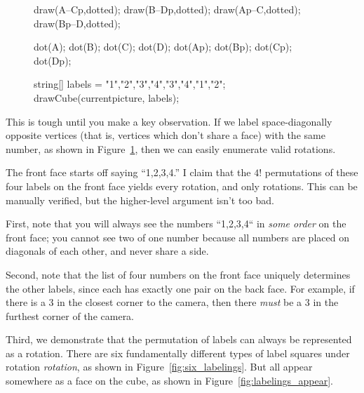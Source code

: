 \documentclass[../gatm_answers.tex]{subfiles}
\begin{document}
\begin{figure}[h]
	\begin{center}
		\begin{minipage}[b]{\textwidth}
			\centering
			\begin{asy}[width=0.3\textwidth]
			draw(A--Cp,dotted);
			draw(B--Dp,dotted);
			draw(Ap--C,dotted);
			draw(Bp--D,dotted);
			
			dot(A);
			dot(B);
			dot(C);
			dot(D);
			dot(Ap);
			dot(Bp);
			dot(Cp);
			dot(Dp);
			
			string[] labels = {"1","2","3","4","3","4","1","2"};
			drawCube(currentpicture, labels);
			\end{asy}
		\end{minipage}
	\end{center}
	\vspace*{-2\baselineskip}
	\begin{center}
		\begin{minipage}[t]{\textwidth}
			\label{fig:cube_vertices_label}
		\end{minipage}
	\end{center}
	\vspace*{-2\baselineskip}
\end{figure}

\noindent This is tough until you make a key observation. If we label space-diagonally opposite vertices (that is, vertices which don't share a face) with the same number, as shown in Figure~\ref{fig:cube_vertices_label}, then we can easily enumerate valid rotations.

The front face starts off saying ``1,2,3,4.'' I claim that the $4!$ permutations of these four labels on the front face yields every rotation, and only rotations. This can be manually verified, but the higher-level argument isn't too bad.

First, note that you will always see the numbers ``1,2,3,4`` in \textit{some order} on the front face; you cannot see two of one number because all numbers are placed on diagonals of each other, and never share a side.

Second, note that the list of four numbers on the front face uniquely determines the other labels, since each has exactly one pair on the back face. For example, if there is a $3$ in the closest corner to the camera, then there \textit{must} be a $3$ in the furthest corner of the camera.

Third, we demonstrate that the permutation of labels can always be represented as a rotation. There are six fundamentally different types of label squares under rotation \textit{rotation}, as shown in Figure~\ref{fig:six_labelings}. But all appear somewhere as a face on the cube, as shown in Figure~\ref{fig:labelings_appear}.
\end{document}
